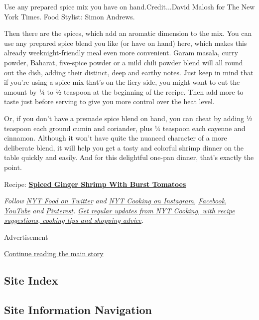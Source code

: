 Use any prepared spice mix you have on hand.Credit...David Malosh for
The New York Times. Food Stylist: Simon Andrews.

Then there are the spices, which add an aromatic dimension to the mix.
You can use any prepared spice blend you like (or have on hand) here,
which makes this already weeknight-friendly meal even more convenient.
Garam masala, curry powder, Baharat, five-spice powder or a mild chili
powder blend will all round out the dish, adding their distinct, deep
and earthy notes. Just keep in mind that if you're using a spice mix
that's on the fiery side, you might want to cut the amount by ¼ to ½
teaspoon at the beginning of the recipe. Then add more to taste just
before serving to give you more control over the heat level.

Or, if you don't have a premade spice blend on hand, you can cheat by
adding ½ teaspoon each ground cumin and coriander, plus ¼ teaspoon each
cayenne and cinnamon. Although it won't have quite the nuanced character
of a more deliberate blend, it will help you get a tasty and colorful
shrimp dinner on the table quickly and easily. And for this delightful
one-pan dinner, that's exactly the point.

Recipe:
\textbf{\href{https://cooking.nytimes3xbfgragh.onion/recipes/1021430-spiced-ginger-shrimp-with-burst-sungold-tomatoes}{Spiced
Ginger Shrimp With Burst Tomatoes}}

\emph{Follow} \href{https://twitter.com/nytfood}{\emph{NYT Food on
Twitter}} \emph{and}
\href{https://www.instagram.com/nytcooking/}{\emph{NYT Cooking on
Instagram}}\emph{,}
\href{https://www.facebookcorewwwi.onion/nytcooking/}{\emph{Facebook}}\emph{,}
\href{https://www.youtube.com/nytcooking}{\emph{YouTube}} \emph{and}
\href{https://www.pinterest.com/nytcooking/}{\emph{Pinterest}}\emph{.}
\href{https://www.nytimes3xbfgragh.onion/newsletters/cooking}{\emph{Get
regular updates from NYT Cooking, with recipe suggestions, cooking tips
and shopping advice}}\emph{.}

Advertisement

\protect\hyperlink{after-bottom}{Continue reading the main story}

\hypertarget{site-index}{%
\subsection{Site Index}\label{site-index}}

\hypertarget{site-information-navigation}{%
\subsection{Site Information
Navigation}\label{site-information-navigation}}


